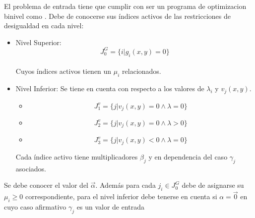 El problema de entrada tiene que cumplir con ser un programa de optimizacion binivel como . 
Debe de conocerse sus índices activos de las restricciones de desigualdad en cada nivel:
\begin{itemize}
    \item Nivel Superior:
            \begin{equation}
             J_0^G=\{i | g_i(x,y)=0\}
            \label{J_0_level_superior} %
            \end{equation}\\
    Cuyos índices activos tienen un $\mu_i$ relacionados.
        
    \item Nivel Inferior:
                Se tiene en cuenta con respecto a los valores de $\lambda_i$ y $v_j(x,y)$.
                
                \begin{itemize}
                    \item \begin{equation}
                        J_1^v=\{j | v_j(x,y)=0 \land \lambda=0 \} %
                        \label{J_0_lambda_0_level_inferior}
                        \end{equation} 
                    \item \begin{equation}
                        J_2^v=\{j | v_j(x,y)=0 \land \lambda>0 \}
                        \label{J_0_lambda_pos_level_inferior}
                    \end{equation}
                    \item \begin{equation}
                        J_3^v=\{j | v_j(x,y)< 0 \land \lambda=0 \}
                        \label{J_neg_lambda_0_level_inferior}
                    \end{equation}
                \end{itemize}
    Cada índice activo tiene multiplicadores $\beta_j$ y en dependencia del caso $\gamma_j$ asociados.
\end{itemize}

Se debe conocer el valor del $\vec{\alpha}$. 
Además para cada $j_i \in J_0^G$  debe de asignarse su $\mu_i \geq 0$ correspondiente,
para el nivel inferior debe tenerse en cuenta si $\alpha=\vec{0}$ en cuyo caso afirmativo $\gamma_j$ es un valor de entrada

